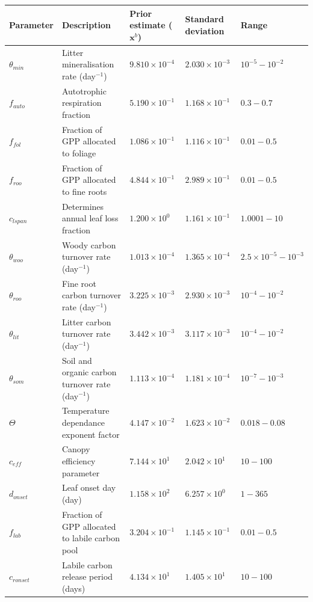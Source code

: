 \begin{table}[ht] 
\begin{center}
\scriptsize
	\begin{tabular}{| l | p{4.5cm} | p{1.7cm} | p{1.7cm} | p{1.7cm} |}
	\hline
	Parameter & Description & Prior estimate ($\textbf{x}^{b}$) & Standard deviation & Range \\ \hline
$\theta_{min}$ & Litter mineralisation rate (day$^{-1}$) & $9.810\times 10^{-4}$ & $2.030\times 10^{-3}$ & $10^{-5} - 10^{-2}$ \\ \hline
$f_{auto}$ & Autotrophic respiration fraction & $5.190\times 10^{-1}$ & $1.168\times 10^{-1}$ & $0.3 - 0.7$  \\ \hline
$f_{fol}$ & Fraction of GPP allocated to foliage & $1.086\times 10^{-1}$ & $1.116\times 10^{-1}$ & $0.01-0.5$ \\ \hline
$f_{roo}$ & Fraction of GPP allocated to fine roots & $4.844\times 10^{-1}$ & $2.989\times 10^{-1}$ & $0.01-0.5$ \\ \hline
$c_{lspan}$ & Determines annual leaf loss fraction & $1.200\times 10^{0} $ & $1.161\times 10^{-1}$ & $1.0001 - 10$ \\ \hline
$\theta_{woo}$ & Woody carbon turnover rate (day$^{-1}$) & $1.013\times 10^{-4}$ & $1.365\times 10^{-4}$ & $2.5\times10^{-5} - 10^{-3}$ \\ \hline
$\theta_{roo}$ & Fine root carbon turnover rate (day$^{-1}$) & $3.225\times 10^{-3}$ & $2.930\times 10^{-3}$ & $10^{-4} - 10^{-2}$ \\ \hline
$\theta_{lit}$ & Litter carbon turnover rate (day$^{-1}$) & $3.442\times 10^{-3}$ & $3.117\times 10^{-3}$ & $10^{-4} - 10^{-2}$ \\ \hline
$\theta_{som}$ & Soil and organic carbon turnover rate (day$^{-1}$) & $1.113\times 10^{-4}$ & $1.181\times 10^{-4}$ & $10^{-7} - 10^{-3}$ \\ \hline
$\Theta$ & Temperature dependance exponent factor & $4.147\times 10^{-2}$ & $1.623\times 10^{-2}$ & $0.018 - 0.08$ \\ \hline
$c_{eff}$ & Canopy efficiency parameter & $7.144\times 10^{1}$ & $2.042\times 10^{1}$ & $10 - 100$ \\ \hline
$d_{onset}$ & Leaf onset day (day) & $1.158\times 10^{2}$ & $6.257\times 10^{0}$ & $1 - 365$ \\ \hline
$f_{lab}$ & Fraction of GPP allocated to labile carbon pool & $3.204\times 10^{-1}$ & $1.145\times 10^{-1}$ & $0.01 - 0.5$ \\ \hline
$c_{ronset}$ & Labile carbon release period (days) & $4.134\times 10^{1}$ & $1.405\times 10^{1}$ & $10 - 100$ \\ \hline

\end{tabular}
\end{center}
\end{table}
